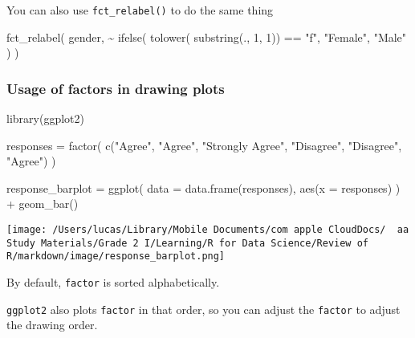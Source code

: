 \documentclass[
]{article}
\let\oldincludegraphics\includegraphics
\renewcommand{\includegraphics}[2][]{\begin{center}\oldincludegraphics[#1]{#2}\end{center}}
\newenvironment{Shaded}{}{}
\newcommand{\AttributeTok}[1]{\textcolor[rgb]{0.49,0.56,0.16}{#1}}
\newcommand{\DecValTok}[1]{\textcolor[rgb]{0.25,0.63,0.44}{#1}}
\newcommand{\FunctionTok}[1]{\textcolor[rgb]{0.02,0.16,0.49}{#1}}
\newcommand{\NormalTok}[1]{#1}
\newcommand{\OtherTok}[1]{\textcolor[rgb]{0.00,0.44,0.13}{#1}}
\newcommand{\SpecialCharTok}[1]{\textcolor[rgb]{0.25,0.44,0.63}{#1}}
\newcommand{\StringTok}[1]{\textcolor[rgb]{0.25,0.44,0.63}{#1}}
\begin{document}
You can also use \texttt{fct\_relabel()} to do the same thing

\begin{Shaded}
\begin{Highlighting}[]
\FunctionTok{fct\_relabel}\NormalTok{(}
\NormalTok{  gender,}
  \SpecialCharTok{\textasciitilde{}} \FunctionTok{ifelse}\NormalTok{(}
    \FunctionTok{tolower}\NormalTok{(}
      \FunctionTok{substring}\NormalTok{(., }\DecValTok{1}\NormalTok{, }\DecValTok{1}\NormalTok{)) }\SpecialCharTok{==} \StringTok{"f"}\NormalTok{,}
    \StringTok{"Female"}\NormalTok{,}
    \StringTok{"Male"}
\NormalTok{  )}
\NormalTok{)}
\end{Highlighting}
\end{Shaded}

\hypertarget{usage-of-factors-in-drawing-plots}{%
\subsubsection{Usage of factors in drawing
plots}\label{usage-of-factors-in-drawing-plots}}

\begin{Shaded}
\begin{Highlighting}[]
\FunctionTok{library}\NormalTok{(ggplot2)}

\NormalTok{responses }\OtherTok{=}
  \FunctionTok{factor}\NormalTok{(}
    \FunctionTok{c}\NormalTok{(}\StringTok{"Agree"}\NormalTok{, }\StringTok{"Agree"}\NormalTok{, }\StringTok{"Strongly Agree"}\NormalTok{, }\StringTok{"Disagree"}\NormalTok{, }\StringTok{"Disagree"}\NormalTok{, }\StringTok{"Agree"}\NormalTok{)}
\NormalTok{  )}

\NormalTok{response\_barplot }\OtherTok{=}
  \FunctionTok{ggplot}\NormalTok{(}
    \AttributeTok{data =} \FunctionTok{data.frame}\NormalTok{(responses),}
    \FunctionTok{aes}\NormalTok{(}\AttributeTok{x =}\NormalTok{ responses)}
\NormalTok{  ) }\SpecialCharTok{+}
  \FunctionTok{geom\_bar}\NormalTok{()}
\end{Highlighting}
\end{Shaded}

\texttt{[image: /Users/lucas/Library/Mobile Documents/com~apple~CloudDocs/~~aa Study Materials/Grade 2 I/Learning/R for Data Science/Review of R/markdown/image/response\_barplot.png]}

By default, \texttt{factor} is sorted alphabetically.

\texttt{ggplot2} also plots \texttt{factor} in that order, so you can
adjust the \texttt{factor} to adjust the drawing order.
\end{document}
